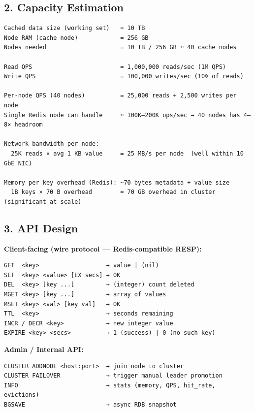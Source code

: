 \documentclass[11pt]{article}
\begin{document}
\subsection{2. Capacity Estimation}\label{2-capacity-estimation-2}

\setcodelang{}

\begin{verbatim}
Cached data size (working set)   = 10 TB
Node RAM (cache node)            = 256 GB
Nodes needed                     = 10 TB / 256 GB ≈ 40 cache nodes

Read QPS                         = 1,000,000 reads/sec (1M QPS)
Write QPS                        = 100,000 writes/sec (10% of reads)

Per-node QPS (40 nodes)          = 25,000 reads + 2,500 writes per node
Single Redis node can handle     ≈ 100K–200K ops/sec → 40 nodes has 4–8× headroom

Network bandwidth per node:
  25K reads × avg 1 KB value     = 25 MB/s per node  (well within 10 GbE NIC)

Memory per key overhead (Redis): ~70 bytes metadata + value size
  1B keys × 70 B overhead        = 70 GB overhead in cluster (significant at scale)
\end{verbatim}

\subsection{3. API Design}\label{3-api-design-2}

\textbf{Client-facing (wire protocol --- Redis-compatible RESP):}

\setcodelang{}

\begin{verbatim}
GET  <key>                   → value | (nil)
SET  <key> <value> [EX secs] → OK
DEL  <key> [key ...]         → (integer) count deleted
MGET <key> [key ...]         → array of values
MSET <key> <val> [key val]   → OK
TTL  <key>                   → seconds remaining
INCR / DECR <key>            → new integer value
EXPIRE <key> <secs>          → 1 (success) | 0 (no such key)
\end{verbatim}

\textbf{Admin / Internal API:}

\setcodelang{}

\begin{verbatim}
CLUSTER ADDNODE <host:port>  → join node to cluster
CLUSTER FAILOVER             → trigger manual leader promotion
INFO                         → stats (memory, QPS, hit_rate, evictions)
BGSAVE                       → async RDB snapshot
\end{verbatim}
\end{document}
